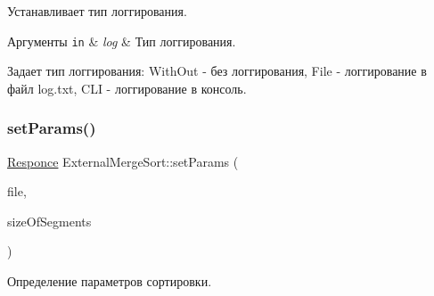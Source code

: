 Устанавливает тип логгирования. 


\begin{DoxyParams}[1]{Аргументы}
\mbox{\tt in}  & {\em log} & Тип логгирования.\\
\hline
\end{DoxyParams}
Задает тип логгирования\+: With\+Out -\/ без логгирования, File -\/ логгирование в файл log.\+txt, C\+LI -\/ логгирование в консоль. \hypertarget{class_external_merge_sort_a2a27571acdf4f42e34798663e37f5e0b}{}\label{class_external_merge_sort_a2a27571acdf4f42e34798663e37f5e0b} 
\subsubsection{\texorpdfstring{set\+Params()}{setParams()}}
{\footnotesize\ttfamily \hyperlink{_structures_8h_a9864d6ef28dd6e38416afac4426b3491}{Responce} External\+Merge\+Sort\+::set\+Params (\begin{DoxyParamCaption}\item[{\hyperlink{class_file_manager}{File\+Manager} $\ast$}]{file,  }\item[{long long}]{size\+Of\+Segments }\end{DoxyParamCaption})}



Определение параметров сортировки. 


